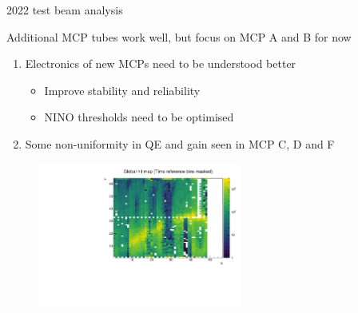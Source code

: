 \documentclass[xcolor={dvipsnames}]{beamer}
\begin{document}
\begin{frame}{2022 test beam analysis}
  \vspace{0.0cm}
  \begin{center}
    {\large Additional MCP tubes work well, but focus on MCP A and B for now}
  \end{center}
  \vspace{0.1cm}
  \begin{enumerate}
    \setlength\itemsep{1.0em}
    \item{Electronics of new MCPs need to be understood better}
    \begin{itemize}
      \item{Improve stability and reliability}
      \item{NINO thresholds need to be optimised}
    \end{itemize}
    \item{Some non-uniformity in QE and gain seen in MCP C, D and F}
  \end{enumerate}
  \begin{figure}
    \centering
    \includegraphics[width = 0.6\textwidth]{Figs/GlobalHitMap_Run480.pdf}
  \end{figure}
\end{frame}
\end{document}
